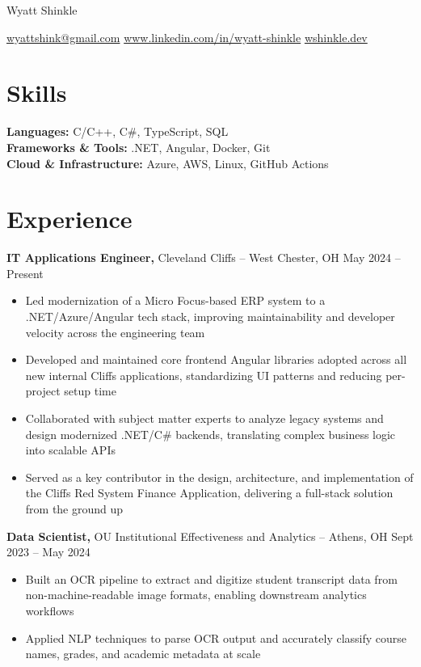 \documentclass[11pt]{article}       %
\begin{document}
\centerline{\Huge Wyatt Shinkle}

\vspace{5pt}

\centerline{\href{mailto:wyattshink@gmail.com}{wyattshink@gmail.com} \textbar{} \href{https://www.linkedin.com/in/wyatt-shinkle}{www.linkedin.com/in/wyatt-shinkle} \textbar{} \href{https://wshinkle.dev}{wshinkle.dev}}

\vspace{-10pt}

\section*{Skills}
\textbf{Languages:} C/C++, C\#, TypeScript, SQL \\
\textbf{Frameworks \& Tools:} .NET, Angular, Docker, Git \\
\textbf{Cloud \& Infrastructure:} Azure, AWS, Linux, GitHub Actions
\vspace{-6.5pt}

\section*{Experience}
\textbf{IT Applications Engineer,} {Cleveland Cliffs} -- West Chester, OH \hfill May 2024 -- Present \\
\vspace{-9pt}
\begin{itemize}
    \item Led modernization of a Micro Focus-based ERP system to a .NET/Azure/Angular tech stack, improving maintainability and developer velocity across the engineering team
    \item Developed and maintained core frontend Angular libraries adopted across all new internal Cliffs applications, standardizing UI patterns and reducing per-project setup time
    \item Collaborated with subject matter experts to analyze legacy systems and design modernized .NET/C\# backends, translating complex business logic into scalable APIs
    \item Served as a key contributor in the design, architecture, and implementation of the Cliffs Red System Finance Application, delivering a full-stack solution from the ground up
\end{itemize}

\textbf{Data Scientist,} {OU Institutional Effectiveness and Analytics} -- Athens, OH \hfill Sept 2023 -- May 2024 \\
\vspace{-9pt}
\begin{itemize}
    \item Built an OCR pipeline to extract and digitize student transcript data from non-machine-readable image formats, enabling downstream analytics workflows
    \item Applied NLP techniques to parse OCR output and accurately classify course names, grades, and academic metadata at scale
\end{itemize}
\end{document}
